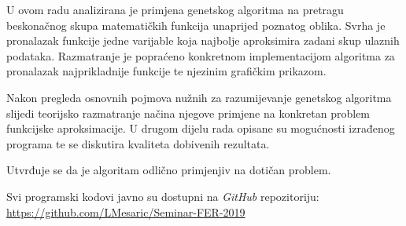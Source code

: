 \documentclass[times, utf8, seminar, numeric]{fer}
\begin{document}
U ovom radu analizirana je primjena genetskog algoritma na pretragu beskonačnog skupa matematičkih funkcija unaprijed poznatog oblika.
Svrha je pronalazak funkcije jedne varijable koja najbolje aproksimira zadani skup ulaznih podataka.
Razmatranje je popraćeno konkretnom implementacijom algoritma za pronalazak najprikladnije funkcije te njezinim grafičkim prikazom.

Nakon pregleda osnovnih pojmova nužnih za razumijevanje genetskog algoritma slijedi teorijsko razmatranje načina njegove primjene na konkretan problem funkcijske aproksimacije.
U drugom dijelu rada opisane su mogućnosti izrađenog programa te se diskutira kvaliteta dobivenih rezultata.

Utvrđuje se da je algoritam odlično primjenjiv na dotičan problem.
\bigskip

Svi programski kodovi javno su dostupni na \textit{GitHub} repozitoriju:\\
\url{https://github.com/LMesaric/Seminar-FER-2019}
\end{document}
